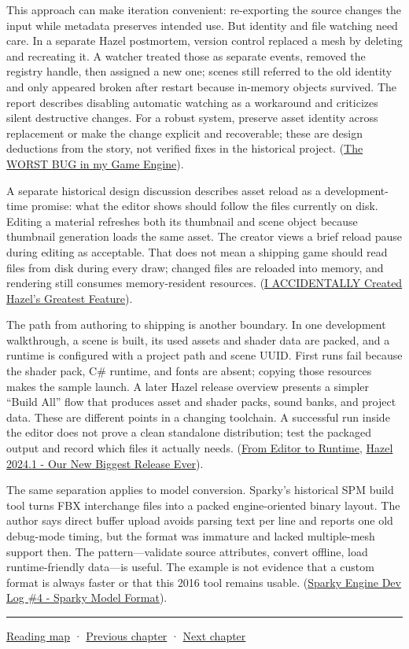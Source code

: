 This approach can make iteration convenient: re-exporting the source changes the input while metadata preserves intended use. But identity and file watching need care. In a separate Hazel postmortem, version control replaced a mesh by deleting and recreating it. A watcher treated those as separate events, removed the registry handle, then assigned a new one; scenes still referred to the old identity and only appeared broken after restart because in-memory objects survived. The report describes disabling automatic watching as a workaround and criticizes silent destructive changes. For a robust system, preserve asset identity across replacement or make the change explicit and recoverable; these are design deductions from the story, not verified fixes in the historical project. (\href{https://www.youtube.com/watch?v=x5dy8T9dRPk&t=0m3s}{The WORST BUG in my Game Engine}).

A separate historical design discussion describes asset reload as a development-time promise: what the editor shows should follow the files currently on disk. Editing a material refreshes both its thumbnail and scene object because thumbnail generation loads the same asset. The creator views a brief reload pause during editing as acceptable. That does not mean a shipping game should read files from disk during every draw; changed files are reloaded into memory, and rendering still consumes memory-resident resources. (\href{https://www.youtube.com/watch?v=yMRp9DVZYnI&t=13m14s}{I ACCIDENTALLY Created Hazel's Greatest Feature}).

The path from authoring to shipping is another boundary. In one development walkthrough, a scene is built, its used assets and shader data are packed, and a runtime is configured with a project path and scene UUID. First runs fail because the shader pack, C\# runtime, and fonts are absent; copying those resources makes the sample launch. A later Hazel release overview presents a simpler ``Build All'' flow that produces asset and shader packs, sound banks, and project data. These are different points in a changing toolchain. A successful run inside the editor does not prove a clean standalone distribution; test the packaged output and record which files it actually needs. (\href{https://www.youtube.com/watch?v=Z2U-S3fxAg8&t=18m4s}{From Editor to Runtime}, \href{https://www.youtube.com/watch?v=10OVd1VHEZ4&t=9m45s}{Hazel 2024.1 - Our New Biggest Release Ever}).

The same separation applies to model conversion. Sparky's historical SPM build tool turns FBX interchange files into a packed engine-oriented binary layout. The author says direct buffer upload avoids parsing text per line and reports one old debug-mode timing, but the format was immature and lacked multiple-mesh support then. The pattern---validate source attributes, convert offline, load runtime-friendly data---is useful. The example is not evidence that a custom format is always faster or that this 2016 tool remains usable. (\href{https://www.youtube.com/watch?v=EUy8G3uMitI&t=3m47s}{Sparky Engine Dev Log \#4 - Sparky Model Format}).

\begin{center}\rule{0.5\linewidth}{0.5pt}\end{center}

\hyperref[volume-reading-map]{Reading map} · \hyperref[06-engine-ii-ch031]{Previous chapter} · \hyperref[06-engine-ii-ch033]{Next chapter}
